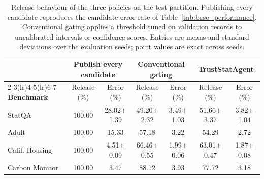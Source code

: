 \documentclass[preprint,12pt,authoryear]{elsarticle}
\begin{document}
\begin{table}[t]
\centering
\scriptsize
\caption{Release behaviour of the three policies on the test partition. Publishing every candidate reproduces the candidate error rate of Table~\ref{tab:base_performance}. Conventional gating applies a threshold tuned on validation records to uncalibrated intervals or confidence scores. Entries are means and standard deviations over the evaluation seeds; point values are exact across seeds.}
\label{tab:release_behaviour}
\setlength{\tabcolsep}{3pt}
\begin{tabularx}{\linewidth}{@{}lcccccc@{}}
\toprule
& \multicolumn{2}{c}{\textbf{Publish every candidate}} & \multicolumn{2}{c}{\textbf{Conventional gating}} & \multicolumn{2}{c}{\textbf{TrustStatAgent}}\\
\cmidrule(lr){2-3}\cmidrule(lr){4-5}\cmidrule(lr){6-7}
\textbf{Benchmark} & Release (\%) & Error (\%) & Release (\%) & Error (\%) & Release (\%) & Error (\%)\\
\midrule
StatQA & 100.00 & 28.02$\pm$1.39 & 49.20$\pm$2.32 & 3.49$\pm$1.03 & 51.66$\pm$3.37 & 3.82$\pm$1.04\\
Adult & 100.00 & 15.33 & 57.18 & 3.22 & 54.29 & 2.72\\
Calif. Housing & 100.00 & 4.51$\pm$0.09 & 66.46$\pm$0.55 & 1.99$\pm$0.06 & 63.01$\pm$0.47 & 1.87$\pm$0.08\\
Carbon Monitor & 100.00 & 3.47 & 88.12 & 3.93 & 77.72 & 3.18\\
\bottomrule
\end{tabularx}
\end{table}
\end{document}
